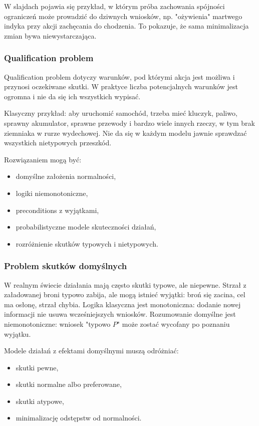 W slajdach pojawia się przykład, w którym próba zachowania spójności ograniczeń może prowadzić do dziwnych wniosków, np. "ożywienia" martwego indyka przy akcji zachęcania do chodzenia. To pokazuje, że sama minimalizacja zmian bywa niewystarczająca.

\subsubsection{Qualification problem}

Qualification problem dotyczy warunków, pod którymi akcja jest możliwa i przynosi oczekiwane skutki. W praktyce liczba potencjalnych warunków jest ogromna i nie da się ich wszystkich wypisać.

Klasyczny przykład: aby uruchomić samochód, trzeba mieć kluczyk, paliwo, sprawny akumulator, sprawne przewody i bardzo wiele innych rzeczy, w tym brak ziemniaka w rurze wydechowej. Nie da się w każdym modelu jawnie sprawdzać wszystkich nietypowych przeszkód.

Rozwiązaniem mogą być:
\begin{itemize}
  \item domyślne założenia normalności,
  \item logiki niemonotoniczne,
  \item preconditions z wyjątkami,
  \item probabilistyczne modele skuteczności działań,
  \item rozróżnienie skutków typowych i nietypowych.
\end{itemize}

\subsubsection{Problem skutków domyślnych}

W realnym świecie działania mają często skutki typowe, ale niepewne. Strzał z załadowanej broni typowo zabija, ale mogą istnieć wyjątki: broń się zacina, cel ma osłonę, strzał chybia. Logika klasyczna jest monotoniczna: dodanie nowej informacji nie usuwa wcześniejszych wniosków. Rozumowanie domyślne jest niemonotoniczne: wniosek "typowo $P$" może zostać wycofany po poznaniu wyjątku.

Modele działań z efektami domyślnymi muszą odróżniać:
\begin{itemize}
  \item skutki pewne,
  \item skutki normalne albo preferowane,
  \item skutki atypowe,
  \item minimalizację odstępstw od normalności.
\end{itemize}

